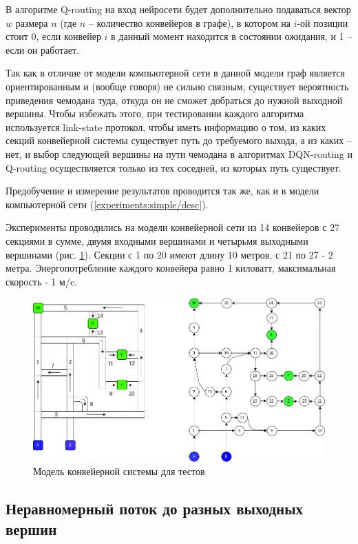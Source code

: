 \documentclass[specification, annotation]{itmo-student-thesis}
\begin{document}
В алгоритме Q-routing на вход нейросети будет дополнительно подаваться вектор
$w$ размера $n$ (где $n$ -- количество конвейеров в графе), в котором на $i$-ой
позиции стоит 0, если конвейер $i$ в данный момент находится в состоянии
ожидания, и 1 -- если он работает.

Так как в отличие от модели компьютерной сети в данной модели граф является
ориентированным и (вообще говоря) не сильно связным, существует вероятность
приведения чемодана туда, откуда он не сможет добраться до нужной выходной
вершины. Чтобы избежать этого, при тестировании каждого алгоритма
используется link-state протокол, чтобы иметь информацию о том, из каких секций
конвейерной системы существует путь до требуемого выхода, а из каких -- нет, и
выбор следующей вершины на пути чемодана в алгоритмах DQN-routing и Q-routing
осуществляется только из тех соседней, из которых путь существует.

Предобучение и измерение результатов проводится так же, как и в модели
компьютерной сети (\ref{experiments:simple/desc}).

Эксперименты проводились на модели конвейерной сети из 14 конвейеров с 27
секциями в сумме, двумя входными вершинами и четырьмя выходными вершинами (рис.
\ref{test-conveyors}). Секции с 1 по 20 имеют длину 10 метров, с 21 по 27 - 2
метра. Энергопотребление каждого конвейера равно 1 киловатт, максимальная
скорость - 1 м/c.

\begin{figure}[!h]
  \caption{Модель конвейерной системы для тестов}\label{test-conveyors}
  \centering
  \includegraphics[scale=0.5]{test-conveyors}
\end{figure}

\subsection{Неравномерный поток до разных выходных вершин}
\end{document}

